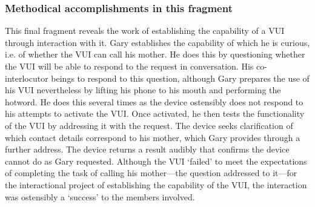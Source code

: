 \subsubsection{Methodical accomplishments in this fragment}\label{sec:empirical cafe findings capability methods}
\begin{revisedsubmission}
This final fragment reveals the work of establishing the capability of a \ac{VUI} through interaction with it.
Gary establishes the capability of which he is curious, i.e. of whether the \ac{VUI} can call his mother.
He does this by questioning whether the \ac{VUI} will be able to respond to the request in conversation.
His co-interlocutor beings to respond to this question, although Gary prepares the use of his \ac{VUI} nevertheless by lifting his phone to his mouth and performing the hotword.
He does this several times as the device ostensibly does not respond to his attempts to activate the \ac{VUI}.
Once activated, he then tests the functionality of the \ac{VUI} by addressing it with the request.
The device seeks clarification of which contact details correspond to his mother, which Gary provides through a further address. The device returns a result audibly that confirms the device cannot do as Gary requested.
Although the \ac{VUI} `failed' to meet the expectations of completing the task of calling his mother---the question addressed to it---for the interactional project of establishing the capability of the \ac{VUI}, the interaction was ostensibly a `success' to the members involved.
\end{revisedsubmission}






